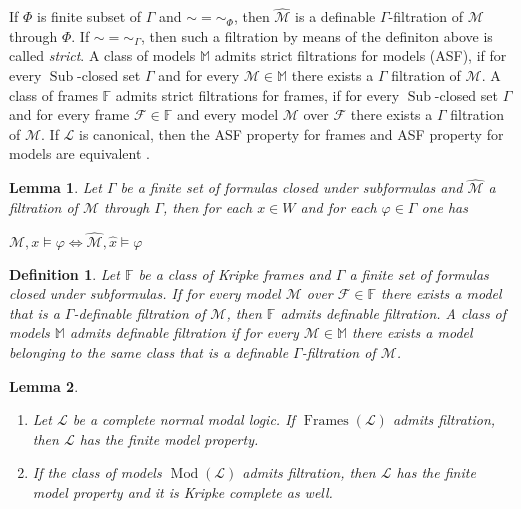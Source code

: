 \documentclass[a4paper]{article}
\theoremstyle{defin}
\newtheorem{defin}{Definition}
\theoremstyle{theorem}
\theoremstyle{prop}
\theoremstyle{lemma}
\newtheorem{lemma}{Lemma}
\theoremstyle{fact}
\theoremstyle{ex}
\theoremstyle{col}
\theoremstyle{claim}
\begin{document}
If $\Phi$ is finite subset of $\Gamma$ and $\sim = \sim_{\Phi}$, then $\widehat{\mathcal{M}}$ is a definable $\Gamma$-filtration of $\mathcal{M}$ through $\Phi$. If $\sim = \sim_{\Gamma}$, then such a filtration by means of the definiton above is called \emph{strict}. A class of models $\mathbb{M}$ admits strict filtrations for models (ASF), if for every $\operatorname{Sub}$-closed set $\Gamma$ and for every $\mathcal{M} \in \mathbb{M}$ there exists a $\Gamma$ filtration of $\mathcal{M}$.
A class of frames $\mathbb{F}$ admits strict filtrations for frames, if for every $\operatorname{Sub}$-closed set $\Gamma$ and for every frame $\mathcal{F} \in \mathbb{F}$ and every model $\mathcal{M}$ over $\mathcal{F}$ there exists a $\Gamma$ filtration of $\mathcal{M}$. If $\mathcal{L}$ is canonical, then the ASF property for frames and ASF property for models are equivalent \cite[Theorem 2.10]{kikot2020completeness}.

\begin{lemma}
  Let $\Gamma$ be a finite set of formulas closed under subformulas and $\widehat{\mathcal{M}}$ a filtration of $\mathcal{M}$ through $\Gamma$, then for each $x \in W$ and for each $\varphi \in \Gamma$ one has
  \begin{center}
    $\mathcal{M}, x \models \varphi \Leftrightarrow \widehat{\mathcal{M}}, \hat{x} \models \varphi$
  \end{center}
\end{lemma}

\begin{defin} Let $\mathbb{F}$ be a class of Kripke frames and $\Gamma$ a finite set of formulas closed under subformulas. If for every model $\mathcal{M}$ over $\mathcal{F} \in \mathbb{F}$ there exists a model that is a $\Gamma$-definable filtration of $\mathcal{M}$, then $\mathbb{F}$ admits definable filtration. A class of models $\mathbb{M}$ admits definable filtration if for every $\mathcal{M} \in \mathbb{M}$ there exists a model belonging to the same class that is a definable $\Gamma$-filtration of $\mathcal{M}$.
\end{defin}

\begin{lemma}
  $ $

\begin{enumerate}
  \item Let $\mathcal{L}$ be a complete normal modal logic. If $\operatorname{Frames}(\mathcal{L})$ admits filtration, then $\mathcal{L}$ has the finite model property.
  \item If the class of models $\operatorname{Mod}(\mathcal{L})$ admits filtration, then $\mathcal{L}$ has the finite model property and it is Kripke complete as well.
\end{enumerate}
\end{lemma}
\end{document}
